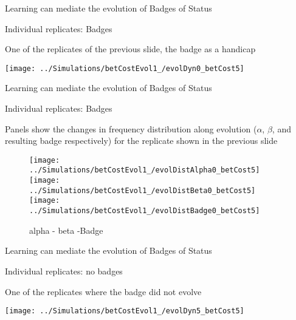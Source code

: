 \documentclass[
  ignorenonframetext,
]{beamer}
\begin{document}
\begin{frame}{Learning can mediate the evolution of Badges of Status}
\protect\hypertarget{learning-can-mediate-the-evolution-of-badges-of-status-1}{}

\begin{block}{Individual replicates: Badges}

\small

One of the replicates of the previous slide, the badge as a handicap

\begin{center}\texttt{[image: ../Simulations/betCostEvol1\_/evolDyn0\_betCost5]} \end{center}

\end{block}

\end{frame}

\begin{frame}{Learning can mediate the evolution of Badges of Status}
\protect\hypertarget{learning-can-mediate-the-evolution-of-badges-of-status-2}{}

\begin{block}{Individual replicates: Badges}

\small

Panels show the changes in frequency distribution along evolution
(\(\alpha\), \(\beta\), and resulting badge respectively) for the
replicate shown in the previous slide

\begin{figure}

\texttt{[image: ../Simulations/betCostEvol1\_/evolDistAlpha0\_betCost5]} \texttt{[image: ../Simulations/betCostEvol1\_/evolDistBeta0\_betCost5]} \texttt{[image: ../Simulations/betCostEvol1\_/evolDistBadge0\_betCost5]} \hfill{}

\caption{alpha - beta -Badge}\label{fig:unnamed-chunk-16}
\end{figure}

\end{block}

\end{frame}

\begin{frame}{Learning can mediate the evolution of Badges of Status}
\protect\hypertarget{learning-can-mediate-the-evolution-of-badges-of-status-3}{}

\begin{block}{Individual replicates: no badges}

\small

One of the replicates where the badge did not evolve

\begin{center}\texttt{[image: ../Simulations/betCostEvol1\_/evolDyn5\_betCost5]} \end{center}

\end{block}

\end{frame}
\end{document}
